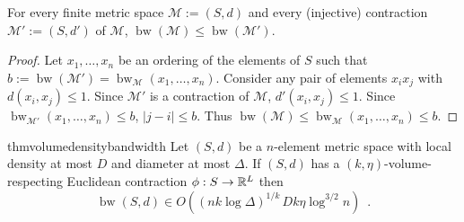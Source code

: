 \documentclass{patmorin}
\renewcommand{\ge}{\geqslant}
\renewcommand{\le}{\leqslant}
\newcommand{\david}[1]{{\color{orange} David: #1}}
\newcommand{\pat}[1]{\textcolor{Blue}{Pat: #1}}
\DeclareMathOperator{\bw}{bw}
\begin{document}

\begin{obs}\label{contraction_increases_bandwidth}
  For every finite metric space $\mathcal{M}:=(S,d)$ and every (injective) contraction $\mathcal{M}':=(S,d')$ of $\mathcal{M}$, $\bw(\mathcal{M}) \le \bw(\mathcal{M}')$.
\end{obs}

\begin{proof}
  Let $x_1,\ldots,x_n$ be an ordering of the elements of $S$ such that $b:=\bw(\mathcal{M}')=\bw_{\mathcal{M}}(x_1,\ldots,x_n)$. Consider any pair of elements $x_ix_j$ with $d(x_i,x_j) \le 1$. Since $\mathcal{M}'$ is a contraction of $\mathcal{M}$, $d'(x_i,x_j)\le 1$.  Since $\bw_{\mathcal{M}'}(x_1,\ldots,x_n)\le b$, $|j-i|\le b$.  Thus $\bw(\mathcal{M})\le \bw_{\mathcal{M}}(x_1,\ldots,x_n)\le b$.
\end{proof}




\begin{restatable}{thm}{volumedensitybandwidth}\label{volume_density_bandwidth}
  Let $(S,d)$ be a $n$-element metric space with local density at most $D$ and diameter at most $\Delta$.  If $(S,d)$ has a $(k,\eta)$-volume-respecting Euclidean contraction $\phi:S\to\mathbb{R}^L$
  then
  \[
    \bw(S,d) \in O((nk\log\Delta)^{1/k}\,Dk\eta\log^{3/2} n) \enspace .
  \]
\end{restatable}
\end{document}
